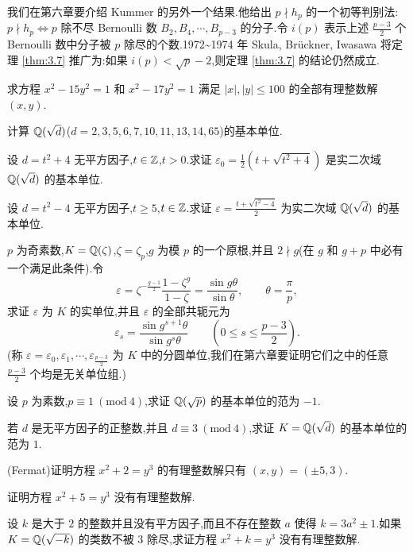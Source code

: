 \begin{remark}
我们在第六章要介绍 Kummer 的另外一个结果.他给出 $p\nmid h_p$ 的一个初等判别法:$p\nmid h_p\Leftrightarrow p$ 除不尽 Bernoulli 数 $B_2,B_4,\cdots,B_{p-3}$ 的分子.令 $i(p)$ 表示上述 $\frac{p-3}{2}$ 个 Bernoulli 数中分子被 $p$ 除尽的个数.1972\~{}1974 年 Skula, Br\"uckner, Iwasawa 将定理 \ref{thm:3.7} 推广为:如果 $i(p)<\sqrt{p}-2$,则定理 \ref{thm:3.7} 的结论仍然成立.
\end{remark}

\begin{Exercises}
  \item 求方程 $x^2-15y^2=1$ 和 $x^2-17y^2=1$ 满足 $|x|,|y|\leqslant 100$ 的全部有理整数解 $(x,y)$.
  \item 计算 $\mathbb{Q}(\sqrt{d})$($d=2,3,5,6,7,10,11,13,14,65$)的基本单位.
  \item 设 $d=t^2+4$ 无平方因子,$t\in\mathbb{Z}$,$t>0$.求证 $\varepsilon_0=\frac{1}{2}(t+\sqrt{t^2+4})$ 是实二次域 $\mathbb{Q}(\sqrt{d})$ 的基本单位.
  \item 设 $d=t^2-4$ 无平方因子,$t\geqslant 5$,$t\in\mathbb{Z}$.求证 $\varepsilon=\frac{t+\sqrt{t^2-4}}{2}$ 为实二次域 $\mathbb{Q}(\sqrt{d})$ 的基本单位.
  \item $p$ 为奇素数,$K=\mathbb{Q}(\zeta)$,$\zeta=\zeta_p$,$g$ 为模 $p$ 的一个原根,并且 $2\nmid g$(在 $g$ 和 $g+p$ 中必有一个满足此条件).令
  \[
    \varepsilon=\zeta^{-\frac{g-1}{2}}\frac{1-\zeta^g}{1-\zeta}=\frac{\sin g\theta}{\sin\theta},\qquad \theta=\frac{\pi}{p},
  \]
  求证 $\varepsilon$ 为 $K$ 的实单位,并且 $\varepsilon$ 的全部共轭元为
  \[
    \varepsilon_s=\frac{\sin g^{s+1}\theta}{\sin g^s\theta}\qquad\left(0\leqslant s\leqslant\frac{p-3}{2}\right).
  \]
  (称 $\varepsilon=\varepsilon_0,\varepsilon_1,\cdots,\varepsilon_{\frac{p-3}{2}}$ 为 $K$ 中的分圆单位,我们在第六章要证明它们之中的任意 $\frac{p-3}{2}$ 个均是无关单位组.)
  \item 设 $p$ 为素数,$p\equiv 1\ (\mathrm{mod}\ 4)$,求证 $\mathbb{Q}(\sqrt{p})$ 的基本单位的范为 $-1$.
  \item 若 $d$ 是无平方因子的正整数,并且 $d\equiv 3\ (\mathrm{mod}\ 4)$,求证 $K=\mathbb{Q}(\sqrt{d})$ 的基本单位的范为 $1$.
  \item (Fermat)证明方程 $x^2+2=y^3$ 的有理整数解只有 $(x,y)=(\pm5,3)$.
  \item 证明方程 $x^2+5=y^3$ 没有有理整数解.
  \item 设 $k$ 是大于 $2$ 的整数并且没有平方因子,而且不存在整数 $a$ 使得 $k=3a^2\pm1$.如果 $K=\mathbb{Q}(\sqrt{-k})$ 的类数不被 $3$ 除尽,求证方程 $x^2+k=y^3$ 没有有理整数解.
\end{Exercises}
